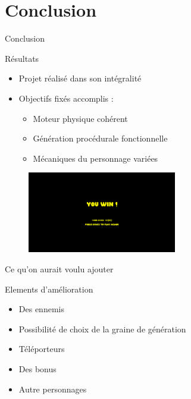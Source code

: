 \documentclass{beamer}
\begin{document}
{\section{Conclusion}
\begin{frame}{Conclusion}
    \begin{block}{R\'esultats}
        \begin{itemize}
            \item[\bullet] Projet réalisé dans son intégralité
            \item[\bullet] Objectifs fixés accomplis :
            \begin{itemize}
                \item[\rightarrow] Moteur physique cohérent
                \item[\rightarrow] Génération procédurale fonctionnelle
                \item[\rightarrow] Mécaniques du personnage variées
            \end{itemize}   
        \end{itemize}
    \end{block}
    \begin{figure}
        \centering
        \includegraphics[width=0.58\textwidth]{images/end.png}
    \end{figure}
\end{frame}

\begin{frame}{Ce qu'on aurait voulu ajouter}
    \begin{block}{Elements d'amélioration}
        \begin{itemize}
          \item[\bullet] Des ennemis
          \item[\bullet] Possibilité de choix de la graine de génération
          \item[\bullet] Téléporteurs
          \item[\bullet] Des bonus
          \item[\bullet] Autre personnages
        \end{itemize}
    \end{block}
\end{frame}

}
\end{document}
